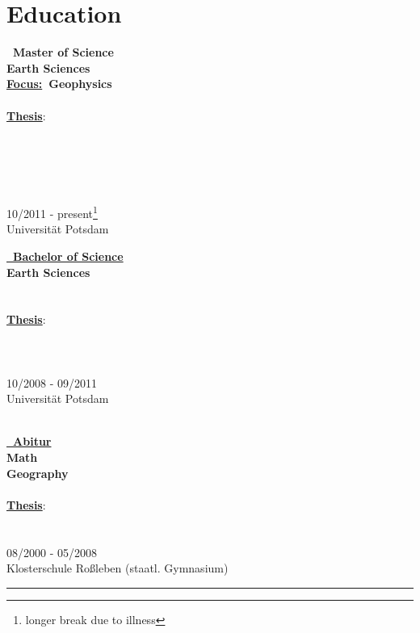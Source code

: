 \documentclass{article}
\begin{document}
\vrule
\hfill
\begin{minipage}[t]{0.65\textwidth}
		\section*{\fontsize{18pt}{24pt}\selectfont \color{pblue} Education}
		\begin{minipage}{0.31\textwidth}
	\textbf{\color{pblue}\faHourglassHalf~Master of Science} \\
	\textbf{Earth Sciences}\\
	\textbf{\underline{Focus:}~Geophysics}\\\\
	\textbf{\underline{Thesis}}:\\\\\\\\\\\\
		10/2011 - present\footnote{longer break due to illness}\\
	Universität Potsdam
		\end{minipage}
		\hfill
		\begin{minipage}{0.33\textwidth}
	\textbf{\href{https://www.dropbox.com/s/297g1chiby8mrd3/Bachelor-Certificate.pdf?dl=0}{\color{pblue}\faGraduationCap~Bachelor of Science}}\\
	\textbf{Earth Sciences}\\\\\\
	\textbf{\underline{Thesis}}:\\
	\href{https://www.dropbox.com/s/3kngo4hpb0c47ww/Bachelorarbeit.pdf?dl=0}{}\\\\\\
	{10/2008 - 09/2011}\\
Universität Potsdam\\\\
		\end{minipage}
		\hfill
		\begin{minipage}{0.3\textwidth}
	\textbf{\href{https://www.dropbox.com/s/nsgmvy7o64xb9si/Abiturzeugnis.pdf?dl=0}{\color{pblue}\faGraduationCap~Abitur}}\\
	\textbf{Math}\\
	\textbf{Geography}\\\\
	\textbf{\underline{Thesis}}:\\
	 \\\\
	 08/2000 - 05/2008\\
Klosterschule Roßleben (staatl. Gymnasium)\\
		\end{minipage}
		\hrule

\end{minipage}
\end{document}
